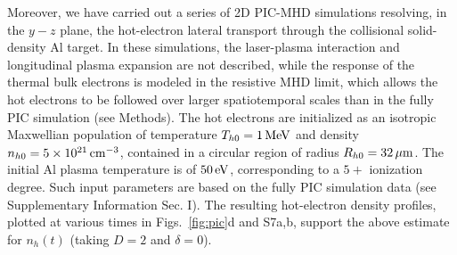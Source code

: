 \documentclass[aps,twocolumn,showpacs,superscriptaddress]{revtex4}
\begin{document}
Moreover, we have carried out a series of 2D PIC-MHD simulations resolving, in the $y-z$ plane, the hot-electron lateral transport through the collisional solid-density Al target. In these simulations, the laser-plasma interaction and longitudinal plasma expansion are not described, while the response of the thermal bulk electrons is modeled in the resistive MHD limit, which allows the hot electrons to be followed over larger spatiotemporal scales than in the fully PIC simulation (see Methods). The hot electrons are initialized as an isotropic Maxwellian population of temperature $T_{h0}=1\,\rm MeV$ and density $n_{h0}=5\times10^{21}\,\rm cm^{-3}$, contained in a circular region of radius $R_{h0}=32\,\rm \mu m$. The initial Al plasma temperature is of $50\,\rm eV$, corresponding to a $5+$ ionization degree. Such input parameters are based on the fully PIC simulation data (see Supplementary Information Sec. I). The resulting hot-electron density profiles, plotted at various times in Figs.~\ref{fig:pic}d and S7a,b, support the above estimate for $n_h(t)$ (taking $D=2$ and $\delta=0$).
\end{document}
